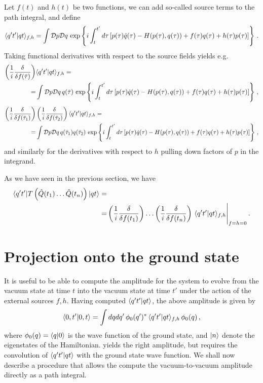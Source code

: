 Let $f(t)$ and $h(t)$ be two functions, we can add so-called source
terms to the path integral, and define
\begin{equation}
  \label{eq:PathIntegralSources}
  \langle q't' | qt \rangle_{f,h} = \int \mathcal{D}p \mathcal{D}q\,\exp 
  \left\{
    i \int_{t}^{t'} d\tau \left[
      p(\tau) \dot{q}(\tau) - H(p(\tau),q(\tau)) + f(\tau) q(\tau) +
      h(\tau) p(\tau)
      \right]
  \right\}\, .
\end{equation}
Taking functional derivatives with respect to the source fields yields
e.g.
\begin{align}
  \left(\frac{1}{i} \frac{\delta}{\delta f(\bar\tau)} \right)&
  \langle q't' | qt \rangle_{f,h} = \nonumber \\
  =&\int \mathcal{D}p \mathcal{D}q\,
  q(\bar{\tau})\,
  \exp \left\{
  i \int_{t}^{t'} d\tau \left[
  p(\tau) \dot{q}(\tau) - H(p(\tau),q(\tau)) + f(\tau) q(\tau) +
  h(\tau) p(\tau)
  \right]
  \right\}\, ,
\end{align}
\begin{align}
  \left(\frac{1}{i} \frac{\delta}{\delta f(\bar\tau_1)} \right)&
  \left(\frac{1}{i} \frac{\delta}{\delta f(\bar\tau_2)} \right)
  \langle q't' | qt \rangle_{f,h} = \nonumber \\
  =&\int \mathcal{D}p \mathcal{D}q\,
  q(\bar{\tau}_1) q(\bar{\tau}_2)\,
  \exp \left\{
  i \int_{t}^{t'} d\tau \left[
  p(\tau) \dot{q}(\tau) - H(p(\tau),q(\tau)) + f(\tau) q(\tau) +
  h(\tau) p(\tau)
  \right]
  \right\}\, , 
\end{align}
and similarly for the derivatives with respect to $h$ pulling down
factors of $p$ in the integrand. 

As we have seen in the previous section, we have
\begin{align}
  \langle q't' |  T\left(
  \hat{Q}(t_1)\ldots \hat{Q}(t_n) 
  \right)
  | qt \rangle =& \nonumber \\
  =& \left(\frac{1}{i} \frac{\delta}{\delta f(t_1)} \right) \ldots
    \left(\frac{1}{i} \frac{\delta}{\delta f(t_n)} \right)\,
    \langle q't' | qt \rangle_{f,h}\Bigg|_{f=h=0}\, .
\end{align}

\section{Projection onto the ground state}
\label{sec:proj-onto-ground}

It is useful to be able to compute the amplitude for the system to
evolve from the vacuum state at time $t$ into the vacuum state at time
$t'$ under the action of the external sources $f,h$. Having computed
$\langle q't' | qt \rangle$, the above amplitude is given by
\begin{align}
  \label{eq:VacToVacAmpl}
  \langle 0,t' | 0,t \rangle = 
  \int dq dq'\, \phi_0(q')^*\, \langle q't' | qt \rangle_{f,h}\, \phi_0(q)\, ,
\end{align}
where $\phi_0(q)=\langle q | 0 \rangle$ is the wave function of the ground
state, and $| n \rangle$ denote the eigenstates of the
Hamiltonian.  yields the right amplitude, but
requires the convolution of $\langle q't' | qt \rangle$ with the ground state
wave function. We shall now describe a procedure that allows the
compute the vacuum-to-vacuum amplitude directly as a path integral. 

